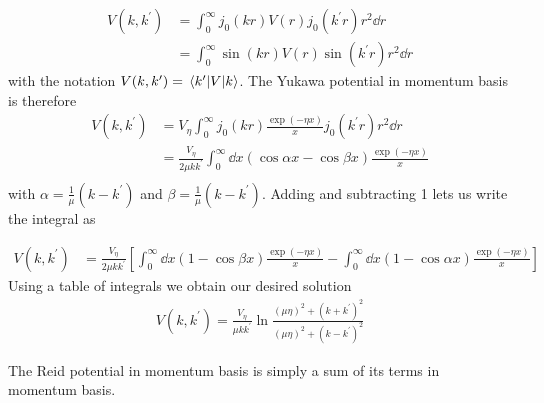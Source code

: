 \newcommand{\kp}{k^{\prime}}
\begin{align*}
  V(k, \kp{}) &= \int_{0}^{\infty}j_{0}(kr)V(r)j_{0}(k^{\prime}r)r^{2}\dd r\\
  &=  \int_{0}^{\infty}\sin(kr)V(r)\sin(k^{\prime}r)r^{2}\dd r
\end{align*}
with the notation \(V(k, \kp{}) = \mel{\kp{}}{V}{k}\). The Yukawa potential in
momentum basis is therefore
\begin{align*}
  V(k, \kp{}) &= V_{\eta} \int_{0}^{\infty}j_{0}(kr)\frac{\exp(-\eta x)}{x}j_{0}(k^{\prime}r)r^{2}\dd r\\
              &= \frac{V_{\eta}}{2\mu k\kp{}} \int_{0}^{\infty}\dd x \left( \cos{\alpha x}-\cos{\beta x} \right)\frac{\exp(-\eta x)}{x}\\
  \end{align*}
 with \(\alpha=\frac{1}{\mu}\left( k-k^{\prime} \right)\) and \(\beta =
 \frac{1}{\mu}\left( k-k^{\prime} \right)\). Adding and subtracting 1 lets us
 write the integral as

\begin{align*}
  V(k, \kp{}) &= \frac{V_{\eta}}{2\mu k\kp{}} \left[ \int_{0}^{\infty}\dd x \left( 1-\cos{\beta x} \right)\frac{\exp(-\eta x)}{x}
                - \int_{0}^{\infty}\dd x \left(1-\cos\alpha x\right) \frac{\exp(-\eta x)}{x}\right]
\end{align*}
Using a table of integrals we obtain our desired solution
\begin{align*}
  V(k, \kp{}) = \frac{V_{\eta}}{\mu k \kp{}} \ln \frac{(\mu\eta)^{2}+(k+k^{\prime})^{2}}{(\mu\eta)^{2}+(k-k^{\prime})^{2}}
\end{align*}

The Reid potential in momentum basis is simply a sum of its terms in momentum basis.




